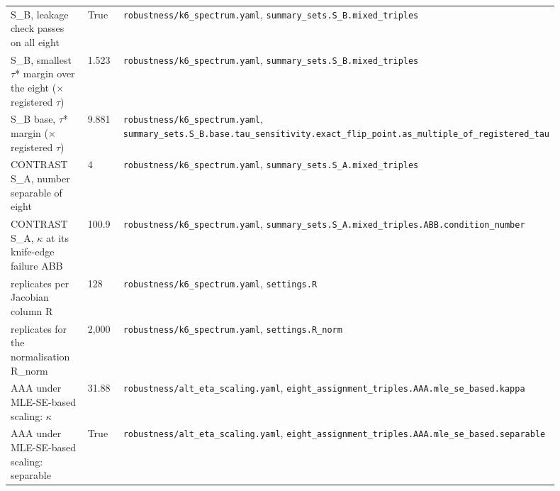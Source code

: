 \begin{longtable}{p{0.35\linewidth} p{0.14\linewidth} p{0.41\linewidth}}
S\_B, leakage check passes on all eight & True & \texttt{\footnotesize robustness/k6\_\allowbreak{}spectrum.\allowbreak{}yaml}, \texttt{\footnotesize summary\_\allowbreak{}sets.\allowbreak{}S\_\allowbreak{}B.\allowbreak{}mixed\_\allowbreak{}triples} \\
S\_B, smallest $\tau$* margin over the eight ($\times$ registered $\tau$) & 1.523 & \texttt{\footnotesize robustness/k6\_\allowbreak{}spectrum.\allowbreak{}yaml}, \texttt{\footnotesize summary\_\allowbreak{}sets.\allowbreak{}S\_\allowbreak{}B.\allowbreak{}mixed\_\allowbreak{}triples} \\
S\_B base, $\tau$* margin ($\times$ registered $\tau$) & 9.881 & \texttt{\footnotesize robustness/k6\_\allowbreak{}spectrum.\allowbreak{}yaml}, \texttt{\footnotesize summary\_\allowbreak{}sets.\allowbreak{}S\_\allowbreak{}B.\allowbreak{}base.\allowbreak{}tau\_\allowbreak{}sensitivity.\allowbreak{}exact\_\allowbreak{}flip\_\allowbreak{}point.\allowbreak{}as\_\allowbreak{}multiple\_\allowbreak{}of\_\allowbreak{}registered\_\allowbreak{}tau} \\
CONTRAST S\_A, number separable of eight & 4 & \texttt{\footnotesize robustness/k6\_\allowbreak{}spectrum.\allowbreak{}yaml}, \texttt{\footnotesize summary\_\allowbreak{}sets.\allowbreak{}S\_\allowbreak{}A.\allowbreak{}mixed\_\allowbreak{}triples} \\
CONTRAST S\_A, $\kappa$ at its knife-edge failure ABB & 100.9 & \texttt{\footnotesize robustness/k6\_\allowbreak{}spectrum.\allowbreak{}yaml}, \texttt{\footnotesize summary\_\allowbreak{}sets.\allowbreak{}S\_\allowbreak{}A.\allowbreak{}mixed\_\allowbreak{}triples.\allowbreak{}ABB.\allowbreak{}condition\_\allowbreak{}number} \\
replicates per Jacobian column R & 128 & \texttt{\footnotesize robustness/k6\_\allowbreak{}spectrum.\allowbreak{}yaml}, \texttt{\footnotesize settings.\allowbreak{}R} \\
replicates for the normalisation R\_norm & 2,000 & \texttt{\footnotesize robustness/k6\_\allowbreak{}spectrum.\allowbreak{}yaml}, \texttt{\footnotesize settings.\allowbreak{}R\_\allowbreak{}norm} \\
AAA under MLE-SE-based scaling: $\kappa$ & 31.88 & \texttt{\footnotesize robustness/alt\_\allowbreak{}eta\_\allowbreak{}scaling.\allowbreak{}yaml}, \texttt{\footnotesize eight\_\allowbreak{}assignment\_\allowbreak{}triples.\allowbreak{}AAA.\allowbreak{}mle\_\allowbreak{}se\_\allowbreak{}based.\allowbreak{}kappa} \\
AAA under MLE-SE-based scaling: separable & True & \texttt{\footnotesize robustness/alt\_\allowbreak{}eta\_\allowbreak{}scaling.\allowbreak{}yaml}, \texttt{\footnotesize eight\_\allowbreak{}assignment\_\allowbreak{}triples.\allowbreak{}AAA.\allowbreak{}mle\_\allowbreak{}se\_\allowbreak{}based.\allowbreak{}separable} \\

\end{longtable}
